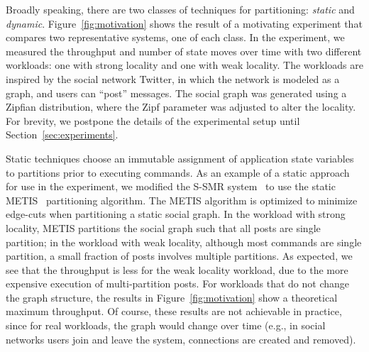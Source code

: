Broadly speaking, there are two classes of techniques for
partitioning: \emph{static} and \emph{dynamic}.
Figure~\ref{fig:motivation} shows the result of a motivating
experiment that compares two representative systems, one of each class. In the
experiment, we measured the throughput and number of state moves over
time with two different workloads: one with strong locality and one
with weak locality. The workloads are inspired by the social network
Twitter, in which the network is modeled as a graph, and users can
``post'' messages. The social graph was generated using a Zipfian
distribution, where the Zipf parameter was adjusted to alter the
locality.  For brevity, we postpone the details of the experimental
setup until Section~\ref{sec:experiments}.


Static techniques choose an immutable assignment of application state variables to partitions
prior to executing commands. As an example of a static approach for
use in the experiment, we modified the S-SMR
system~\cite{bezerra2014ssmr} to use the static
METIS~\cite{Abou-Rjeili:2006} partitioning algorithm.  The METIS
algorithm is optimized to minimize edge-cuts when partitioning a
static social graph. 
In the workload with strong locality, METIS partitions the social graph such that all posts are single partition;
in the workload with weak locality, although most commands are single partition, a small fraction of posts involves multiple partitions.
As expected, we see that the throughput is less
for the weak locality workload, due to the more expensive execution of multi-partition posts.
For workloads that do not change the graph structure, the
results in Figure~\ref{fig:motivation} show a theoretical maximum
throughput.  Of course, these results are not achievable in practice,
since for real workloads, the graph would change over time (e.g., in
social networks users join and leave the system, connections are
created and removed).


